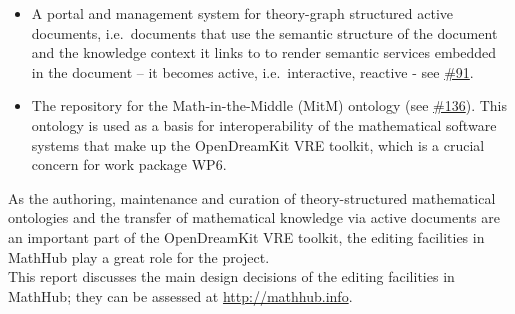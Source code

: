 \begin{itemize}
\item
  A portal and management system for theory-graph structured active
  documents, i.e.~documents that use the semantic structure of the
  document and the knowledge context it links to to render semantic
  services embedded in the document -- it becomes active,
  i.e.~interactive, reactive - see
  \href{https://github.com/OpenDreamKit/OpenDreamKit/issues/91}{\#91}.
\item
  The repository for the Math-in-the-Middle (MitM) ontology (see
  \href{https://github.com/OpenDreamKit/OpenDreamKit/issues/136}{\#136}).
  This ontology is used as a basis for interoperability of the
  mathematical software systems that make up the OpenDreamKit VRE
  toolkit, which is a crucial concern for work package WP6.
\end{itemize}

As the authoring, maintenance and curation of theory-structured
mathematical ontologies and the transfer of mathematical knowledge via
active documents are an important part of the OpenDreamKit VRE toolkit,
the editing facilities in MathHub play a great role for the project.\\
This report discusses the main design decisions of the editing
facilities in MathHub; they can be assessed at
\url{http://mathhub.info}.
